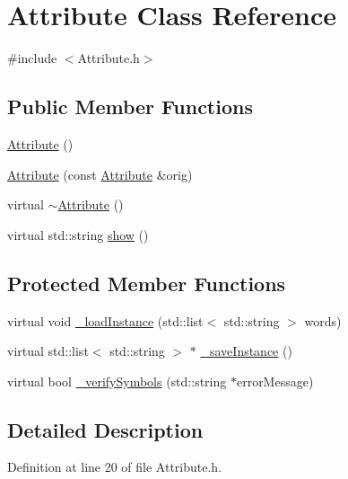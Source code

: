 \hypertarget{class_attribute}{\section{Attribute Class Reference}
\label{class_attribute}
}


{\ttfamily \#include $<$Attribute.\-h$>$}

\subsection*{Public Member Functions}
\begin{DoxyCompactItemize}
\item 
\hyperlink{class_attribute_a8ba4e5a507aef352563e1e56f1930e66}{Attribute} ()
\item 
\hyperlink{class_attribute_a8a0c53bda9cc94180f06bda254809261}{Attribute} (const \hyperlink{class_attribute}{Attribute} \&orig)
\item 
virtual \hyperlink{class_attribute_a28ab087bb886728670e4ae5791bc2ea8}{$\sim$\-Attribute} ()
\item 
virtual std\-::string \hyperlink{class_attribute_aa29f79466bd6ed5e36c402ec57cb2050}{show} ()
\end{DoxyCompactItemize}
\subsection*{Protected Member Functions}
\begin{DoxyCompactItemize}
\item 
virtual void \hyperlink{class_attribute_ac76d3302ec24a4cca1e84fed221cf917}{\-\_\-load\-Instance} (std\-::list$<$ std\-::string $>$ words)
\item 
virtual std\-::list$<$ std\-::string $>$ $\ast$ \hyperlink{class_attribute_a32bd3d820fa2957d4a5d8c98db5b50e0}{\-\_\-save\-Instance} ()
\item 
virtual bool \hyperlink{class_attribute_adbe1f438203db4e87b0c8e1cd5e0182d}{\-\_\-verify\-Symbols} (std\-::string $\ast$error\-Message)
\end{DoxyCompactItemize}


\subsection{Detailed Description}


Definition at line 20 of file Attribute.\-h.



